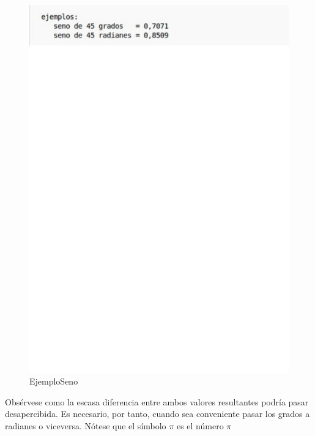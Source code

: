 \begin{figure}[h]
\begin{center}
\includegraphics[scale=0.55]{images/ejemplo_seno.eps}
\end{center}
\caption{EjemploSeno}
\label{graph:4}
\end{figure}

Obsérvese como la escasa diferencia entre ambos valores resultantes podría pasar
desapercibida. Es necesario, por tanto, cuando sea conveniente pasar los grados 
a radianes o viceversa. Nótese que el símbolo $\pi$ es el número $\pi$

